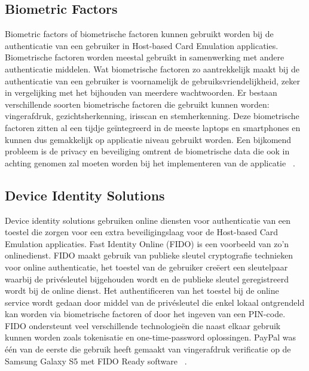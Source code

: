 \subsection{Biometric Factors}
Biometric factors of biometrische factoren kunnen gebruikt worden bij de authenticatie van een gebruiker in Host-based Card Emulation applicaties. Biometrische factoren worden meestal gebruikt in samenwerking met andere authenticatie middelen. Wat biometrische factoren zo aantrekkelijk maakt bij de authenticatie van een gebruiker is voornamelijk de gebruiksvriendelijkheid, zeker in vergelijking met het bijhouden van meerdere wachtwoorden. Er bestaan verschillende soorten biometrische factoren die gebruikt kunnen worden: vingerafdruk, gezichtsherkenning, irisscan en stemherkenning. Deze biometrische factoren zitten al een tijdje geïntegreerd in de meeste laptops en smartphones en kunnen dus gemakkelijk op applicatie niveau gebruikt worden. Een bijkomend probleem is de privacy en beveiliging omtrent de biometrische data die ook in achting genomen zal moeten worden bij het implementeren van de applicatie ~\autocite{SCA2014}.

\subsection{Device Identity Solutions}
Device identity solutions gebruiken online diensten voor authenticatie van een toestel die zorgen voor een extra beveiligingslaag voor de Host-based Card Emulation applicaties. Fast Identity Online (FIDO) is een voorbeeld van zo'n onlinedienst. FIDO maakt gebruik van publieke sleutel cryptografie technieken voor online authenticatie, het toestel van de gebruiker creëert een sleutelpaar waarbij de privésleutel bijgehouden wordt en de publieke sleutel geregistreerd wordt bij de online dienst. Het authentificeren van het toestel bij de online service wordt gedaan door middel van de privésleutel die enkel lokaal ontgrendeld kan worden via biometrische factoren of door het ingeven van een PIN-code.
FIDO ondersteunt veel verschillende technologieën die naast elkaar gebruik kunnen worden zoals tokenisatie en one-time-password oplossingen. PayPal was één van de eerste die gebruik heeft gemaakt van vingerafdruk verificatie op de Samsung Galaxy S5 met FIDO Ready software ~\autocite{SCA2014}.


